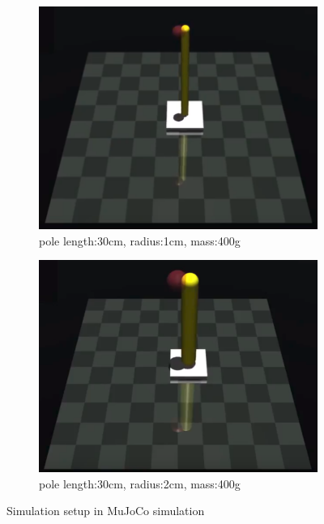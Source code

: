 \documentclass{article}
\begin{document}
\begin{figure}[h!]
  \centering
  \begin{subfigure}[b]{0.4\linewidth}
    \includegraphics[width=\linewidth]{./Figures/pole_30_1.png}
    \caption{pole length:30cm, radius:1cm, mass:400g}
  \end{subfigure}
  \begin{subfigure}[b]{0.422\linewidth}
    \includegraphics[width=\linewidth]{./Figures/pole_30_2.png}
    \caption{pole length:30cm, radius:2cm, mass:400g}
  \end{subfigure}
  \caption{Simulation setup in MuJoCo simulation}
  \label{fig:pole}
\end{figure}
\end{document}

